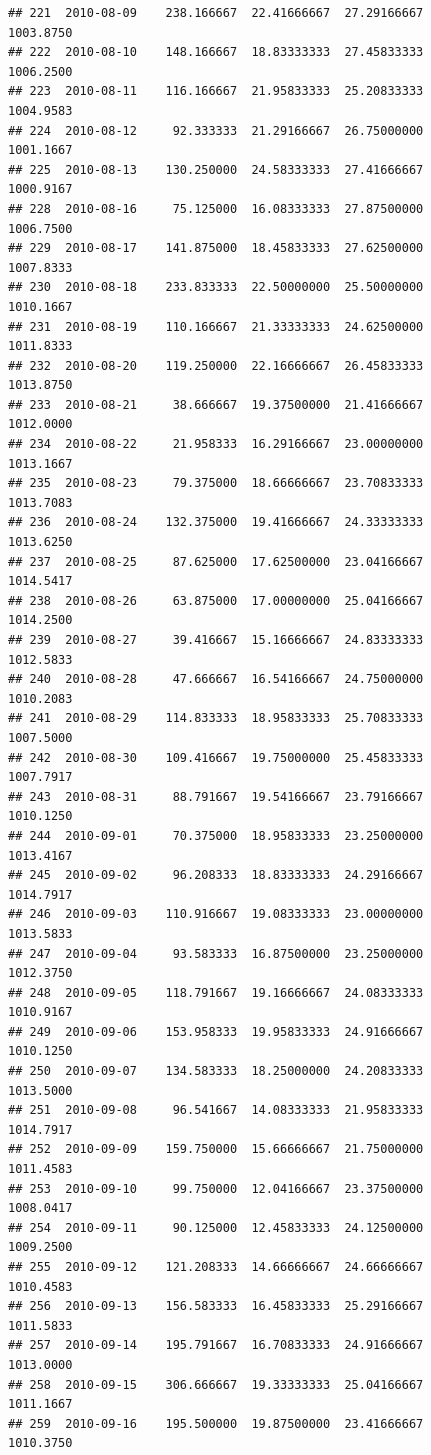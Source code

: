 \documentclass[
]{article}
\begin{document}
\begin{verbatim}
## 221  2010-08-09    238.166667  22.41666667  27.29166667    1003.8750
## 222  2010-08-10    148.166667  18.83333333  27.45833333    1006.2500
## 223  2010-08-11    116.166667  21.95833333  25.20833333    1004.9583
## 224  2010-08-12     92.333333  21.29166667  26.75000000    1001.1667
## 225  2010-08-13    130.250000  24.58333333  27.41666667    1000.9167
## 228  2010-08-16     75.125000  16.08333333  27.87500000    1006.7500
## 229  2010-08-17    141.875000  18.45833333  27.62500000    1007.8333
## 230  2010-08-18    233.833333  22.50000000  25.50000000    1010.1667
## 231  2010-08-19    110.166667  21.33333333  24.62500000    1011.8333
## 232  2010-08-20    119.250000  22.16666667  26.45833333    1013.8750
## 233  2010-08-21     38.666667  19.37500000  21.41666667    1012.0000
## 234  2010-08-22     21.958333  16.29166667  23.00000000    1013.1667
## 235  2010-08-23     79.375000  18.66666667  23.70833333    1013.7083
## 236  2010-08-24    132.375000  19.41666667  24.33333333    1013.6250
## 237  2010-08-25     87.625000  17.62500000  23.04166667    1014.5417
## 238  2010-08-26     63.875000  17.00000000  25.04166667    1014.2500
## 239  2010-08-27     39.416667  15.16666667  24.83333333    1012.5833
## 240  2010-08-28     47.666667  16.54166667  24.75000000    1010.2083
## 241  2010-08-29    114.833333  18.95833333  25.70833333    1007.5000
## 242  2010-08-30    109.416667  19.75000000  25.45833333    1007.7917
## 243  2010-08-31     88.791667  19.54166667  23.79166667    1010.1250
## 244  2010-09-01     70.375000  18.95833333  23.25000000    1013.4167
## 245  2010-09-02     96.208333  18.83333333  24.29166667    1014.7917
## 246  2010-09-03    110.916667  19.08333333  23.00000000    1013.5833
## 247  2010-09-04     93.583333  16.87500000  23.25000000    1012.3750
## 248  2010-09-05    118.791667  19.16666667  24.08333333    1010.9167
## 249  2010-09-06    153.958333  19.95833333  24.91666667    1010.1250
## 250  2010-09-07    134.583333  18.25000000  24.20833333    1013.5000
## 251  2010-09-08     96.541667  14.08333333  21.95833333    1014.7917
## 252  2010-09-09    159.750000  15.66666667  21.75000000    1011.4583
## 253  2010-09-10     99.750000  12.04166667  23.37500000    1008.0417
## 254  2010-09-11     90.125000  12.45833333  24.12500000    1009.2500
## 255  2010-09-12    121.208333  14.66666667  24.66666667    1010.4583
## 256  2010-09-13    156.583333  16.45833333  25.29166667    1011.5833
## 257  2010-09-14    195.791667  16.70833333  24.91666667    1013.0000
## 258  2010-09-15    306.666667  19.33333333  25.04166667    1011.1667
## 259  2010-09-16    195.500000  19.87500000  23.41666667    1010.3750

\end{verbatim}
\end{document}
